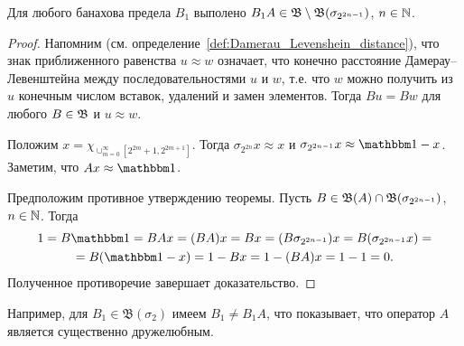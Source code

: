 \begin{lemma}
	Для любого банахова предела $B_1$ выполено $B_1 A \in \mathfrak B \setminus \mathfrak{B} (\sigma_{2^{2n-1}})$, $n\in \mathbb{N}$.
\end{lemma}

\begin{proof}
	Напомним (см. определение~\ref{def:Damerau_Levenshein_distance}), что знак приближенного равенства $ u \approx w$ означает,
	что конечно расстояние Дамерау--Левенштейна между последовательностями
	$u$ и $w$,
	т.е. что $w$ можно получить из $u$ конечным числом вставок, удалений и замен элементов.
	Тогда $Bu = Bw$ для любого $B\in\mathfrak{B}$ и $u \approx w$.

	Положим $x = \chi_{\cup_{m=0}^{\infty}\left[2^{2 m}+1, 2^{2 m+1}\right]}$.
	Тогда $\sigma_{2^{2n}} x \approx x$ и $\sigma_{2^{2n-1}} x \approx \one - x$.
	Заметим, что $Ax \approx \one$.

	Предположим противное утверждению теоремы.
	Пусть $B \in \mathfrak{B}(A) \cap \mathfrak{B} (\sigma_{2^{2n-1}})$, $n\in \mathbb{N}$.
	Тогда
	\begin{multline}
		1 = B\one = BAx = (BA)x = Bx =
		(B\sigma_{2^{2n-1}}) x = B (\sigma_{2^{2n-1}} x) =
		\\=
		B(\one -x) = 1 - Bx = 1 - (BA)x = 1-1 = 0
		.
	\end{multline}
	Полученное противоречие завершает доказательство.
\end{proof}

\begin{remark}
	Например, для $B_1 \in \mathfrak B (\sigma_2)$ имеем $B_1 \ne B_1 A$, что показывает,
	что оператор $A$ является существенно дружелюбным.
\end{remark}


